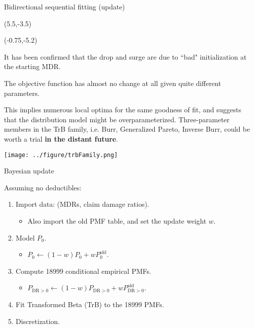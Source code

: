 \documentclass[aspectratio=169]{beamer}
\begin{document}
\begin{frame}{Bidirectional sequential fitting (update)}
\begin{textblock}{1}(5.5,-3.5)
\end{textblock}


\begin{textblock}{5.5}(-0.75,-5.2)

\tiny It has been confirmed that the drop and surge are due to ``bad" initialization at the starting MDR.\medskip

The objective function has almost no change at all given quite different parameters.\medskip

This implies numerous local optima for the same goodness of fit, and suggests that the distribution model might be overparameterized. Three-parameter members in the TrB family, i.e. Burr, Generalized Pareto, Inverse Burr, could be worth a trial \textbf{in the distant future}. \bigskip

\texttt{[image: ../figure/trbFamily.png]}

\end{textblock}
\end{frame}



\begin{frame}{Bayesian update}

Assuming no deductibles:\medskip

\begin{enumerate}
\item Import data: (MDRs, claim damage ratios).\medskip

\begin{itemize}
\item Also import the old PMF table, and set the update weight $w$.\medskip
\end{itemize}

\item Model $P_0$.\medskip

\begin{itemize}
\item $P_0\gets (1 - w) P_0 + w P_0^{\text{old}}$.\medskip
\end{itemize}

\item Compute 18999 conditional empirical PMFs.\medskip

\begin{itemize}
\item $P_{\text{DR}>0}\gets (1 - w) P_{\text{DR}>0} + w P_{\text{DR}>0}^{\text{old}}$.\medskip
\end{itemize}


\item Fit Transformed Beta (TrB) to the 18999 PMFs.\medskip

\item Discretization.
\end{enumerate}


\end{frame}
\end{document}
